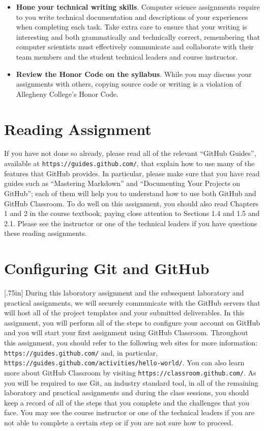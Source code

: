 \documentclass[11pt]{article}
\newcommand{\url}[1]{\lstinline{#1}}
\newcommand{\resource}[1]{\null\hfill\LARGE{\faLink{}}\newline\scriptsize{\em{#1}}}
\begin{document}
\begin{itemize}
\item {\bf Hone your technical writing skills}. Computer science assignments
  require to you write technical documentation and descriptions of your
  experiences when completing each task. Take extra care to ensure that your
  writing is interesting and both grammatically and technically correct,
  remembering that computer scientists must effectively communicate and
  collaborate with their team members and the student technical leaders and
  course instructor.

\item {\bf Review the Honor Code on the syllabus}. While you may discuss your
  assignments with others, copying source code or writing is a violation of
  Allegheny College's Honor Code.

\end{itemize}

\section*{Reading Assignment}

If you have not done so already, please read all of the relevant ``GitHub
Guides'', available at \url{https://guides.github.com/}, that explain how to use
many of the features that GitHub provides. In particular, please make sure that
you have read guides such as ``Mastering Markdown'' and ``Documenting Your
Projects on GitHub''; each of them will help you to understand how to use both
GitHub and GitHub Classroom. To do well on this assignment, you should also read
Chapters 1 and 2 in the course textbook, paying close attention to Sections 1.4
and 1.5 and 2.1. Please see the instructor or one of the technical leaders if
you have questions these reading assignments.

\section*{Configuring Git and GitHub}

\marginnote{\resource{Learn about GitHub}}[.75in] During this laboratory
assignment and the subsequent laboratory and practical assignments, we will
securely communicate with the GitHub servers that will host all of the project
templates and your submitted deliverables. In this assignment, you will perform
all of the steps to configure your account on GitHub and you will start your
first assignment using GitHub Classroom. Throughout this assignment, you should
refer to the following web sites for more information:
\url{https://guides.github.com/} and, in particular,
\url{https://guides.github.com/activities/hello-world/}. You can also learn more
about GitHub Classroom by visiting \url{https://classroom.github.com/}. As you
will be required to use Git, an industry standard tool, in all of the remaining
laboratory and practical assignments and during the class sessions, you should
keep a record of all of the steps that you complete and the challenges that you
face. You may see the course instructor or one of the technical leaders if you
are not able to complete a certain step or if you are not sure how to proceed.
\end{document}
